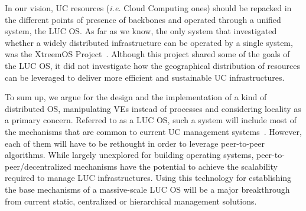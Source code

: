 In our vision, UC resources (\textit{i.e.} Cloud Computing ones) should be repacked in the
different points of presence of backbones and operated through a unified system, the LUC
OS.
%
As far as we know, the only system that investigated whether a widely distributed
infrastructure can be operated by a single system, was the XtreemOS
Project~\cite{morin:2007}. Although this project shared some of the goals of the LUC OS,
it did not investigate how the geographical distribution of resources can be leveraged to
deliver more efficient and sustainable UC infrastructures.
%

To sum up, we argue for the design and the implementation of a kind of distributed OS,
manipulating VEs instead of processes and considering locality as a primary concern.
Referred to as a LUC OS, such a system will include most of the mechanisms that are common
to current UC management
systems~\cite{cloudstack,nimbus,opennebula,openstack,lowe:wiley11,moreno:2012}. However,
each of them will have to be rethought in order to leverage peer-to-peer algorithms.
%
While largely unexplored for building operating systems, peer-to-peer/decentralized
mechanisms have the potential to achieve the scalability required to manage LUC
infrastructures. Using this technology for establishing the base mechanisms of a
massive-scale LUC OS will be a major breakthrough from current static, centralized or
hierarchical management solutions.

%
